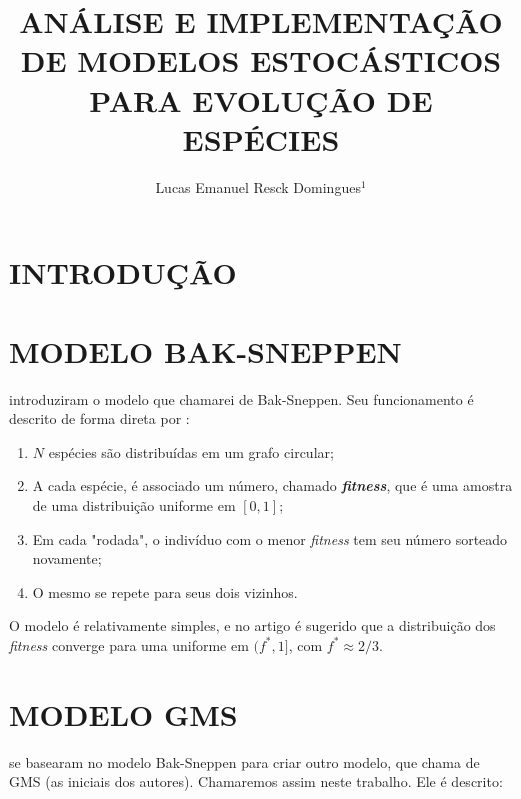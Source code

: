 \documentclass[10pt,brazil,english]{article}
\title{ANÁLISE E IMPLEMENTAÇÃO DE MODELOS ESTOCÁSTICOS PARA EVOLUÇÃO DE ESPÉCIES}
\author{Lucas Emanuel Resck Domingues$^{1}$}
\begin{document}
    \pagestyle{fancy} %
    
    \maketitle
    \newpage

    \newtheorem{theorem}{Teorema}
    
    \section{\uppercase{Introdução}}
    
    \section{\uppercase{Modelo Bak-Sneppen}}

         introduziram o modelo que chamarei de Bak-Sneppen.
        Seu funcionamento é descrito de forma direta por :

        \renewcommand{\theenumi}{\roman{enumi}} 
        \begin{enumerate}
            \item $N$ espécies são distribuídas em um grafo circular;
            \item A cada espécie, é associado um número, chamado \textit{\textbf{fitness}}, que é uma amostra de uma distribuição uniforme em $[0, 1]$;
            \item Em cada "rodada", o indivíduo com o menor \textit{fitness} tem seu número sorteado novamente;
            \item O mesmo se repete para seus dois vizinhos.
        \end{enumerate}

        O modelo é relativamente simples, e no artigo é sugerido que a distribuição dos \textit{fitness} converge para uma uniforme em $(f^*, 1]$, com $f^* \approx 2/3$.

    \section{\uppercase{Modelo GMS}}

         se basearam no modelo Bak-Sneppen para criar outro modelo, que  chama de GMS (as iniciais dos autores). Chamaremos assim neste trabalho. Ele é descrito:
\end{document}
